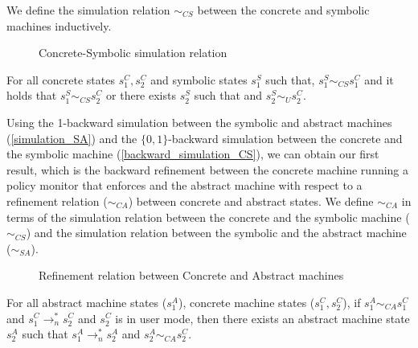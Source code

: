 We define the simulation relation $\sim_{CS}$ between the concrete
and symbolic machines inductively.

\begin{figure}[htb!]
\centering
\begin{minipage}[b]{0.25\linewidth}
\centering
{}
\label{cs_user_sim}
\end{minipage}
\hspace{0.5cm}
\begin{minipage}[b]{0.15\linewidth}
\centering
{}
\label{cs_weak_sim}
\end{minipage}
\caption{Concrete-Symbolic simulation relation}
\end{figure}


\begin{theorem}
\label{backward_simulation_CS}
  For all concrete states $s^C_1, s^C_2$ and symbolic states $s^S_1$ such that,
  $s^S_1 \sim_{CS} s^C_1$ and  it holds that
  $s^S_1 \sim_{CS} s^C_2$ or there exists $s^S_2$ such that
   and $s^S_2 \sim_U s^C_2$.
\end{theorem}

Using the 1-backward simulation between the symbolic and abstract
machines (\cref{simulation_SA}) and the $\lbrace 0,1 \rbrace$-backward
simulation between the concrete and the symbolic machine
(\cref{backward_simulation_CS}), we can obtain our first result, which
is the backward refinement between the concrete machine running a policy
monitor that enforces \CFI and the abstract machine with respect
to a refinement relation ($\sim_{CA}$) between concrete and abstract states.
We define $\sim_{CA}$ in terms of the simulation relation between the
concrete and the symbolic machine ($\sim_{CS}$) and the simulation relation
between the symbolic and the abstract machine ($\sim_{SA}$).

\begin{figure}[htb!]
\caption{Refinement relation between Concrete and Abstract machines}
\label{refinement_CA}
\end{figure}

\begin{theorem}
\label{backward_refinement_CA}
  For all abstract machine states ($s^A_1$), concrete machine states
  ($s^C_1, s^C_2$), if $s^A_1 \sim_{CA} s^C_1$ and
  $s^C_1 \to_n^{*} s^C_2$ and $s^C_2$ is in user mode, then
  there exists an abstract machine state $s^A_2$ such that
  $s^A_1 \to_n^{*} s^A_2$ and $s^A_2 \sim_{CA} s^C_2$.
\end{theorem}

